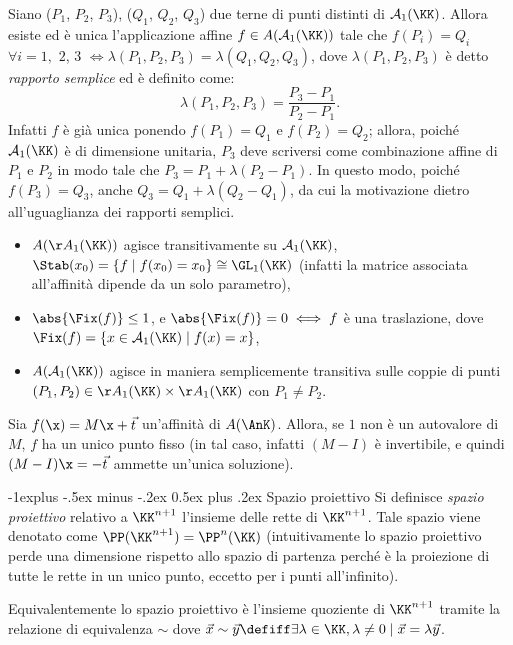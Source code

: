 \documentclass[10pt,landscape]{article}
\makeatletter
\renewcommand{\subsection}{\@startsection{subsection}{2}{0mm}%
	{-1explus -.5ex minus -.2ex}%
	{0.5ex plus .2ex}%
	{\normalfont\normalsize\bfseries}}
\makeatother
\begin{document}
\begin{multicols}{3}
        Siano ($P_1$, $P_2$, $P_3$), ($Q_1$, $Q_2$, $Q_3$) due terne di punti distinti di $\mathcal{A}_1(\KK)$. Allora esiste ed è unica l'applicazione affine $f \in A(\mathcal{A}_1(\KK))$ tale che $f(P_i)=Q_i$ $\forall i=1,$ $2$, $3$ $\iff \lambda(P_1, P_2, P_3)=\lambda(Q_1, Q_2, Q_3)$, dove $\lambda(P_1,P_2,P_3)$ è detto \textit{rapporto semplice} ed è definito come:
        \[ \lambda(P_1, P_2, P_3) = \frac{P_3 - P_1}{P_2 - P_1}. \]
        Infatti $f$ è già unica ponendo $f(P_1) = Q_1$ e $f(P_2) = Q_2$; allora, poiché
        $\mathcal{A}_1(\KK)$ è di dimensione unitaria, $P_3$ deve scriversi come combinazione
        affine di $P_1$ e $P_2$ in modo tale che $P_3 = P_1 + \lambda (P_2 - P_1)$. In questo
        modo, poiché $f(P_3) = Q_3$, anche $Q_3 = Q_1 + \lambda (Q_2 - Q_1)$, da cui la
        motivazione dietro all'uguaglianza dei rapporti semplici.

		\begin{itemize}
			\item $A(\AA_1(\KK))$ agisce transitivamente su $\mathcal{A}_1(\KK)$,
			$\Stab(x_0)=\{f\mid f(x_0)=x_0\} \cong \GL_1(\KK)$ (infatti la matrice associata all'affinità dipende da un solo parametro),
			\item $\abs{\Fix(f)} \leq 1$, e
			$\abs{\Fix(f)}=0 \iff f$ è una traslazione, dove $\Fix(f) = \{x\in \mathcal{A}_1(\KK)\mid f(x)=x\}$,
			\item $A(\mathcal{A}_1(\KK))$ agisce in maniera semplicemente transitiva sulle coppie di punti $(P_1,P_2) \in \AA_1(\KK) \times \AA_1(\KK)$ con $P_1\neq P_2$.
		\end{itemize}
		
		Sia $f(\x) = M\x + \vec t$ un'affinità di $A(\AnK)$. Allora, se $1$ non è un autovalore
		di $M$, $f$ ha un unico punto fisso (in tal caso, infatti $(M-I)$ è invertibile, e quindi $(M-I)\x = -\vec t$ ammette un'unica soluzione).
        
        \subsection{Spazio proiettivo}
        Si definisce \textit{spazio proiettivo} relativo a $\KK^{n+1}$ l'insieme delle rette di $\KK^{n+1}$. Tale spazio viene denotato come $\PP(\KK^{n+1})=\PP^n(\KK)$ (intuitivamente lo spazio proiettivo perde una dimensione rispetto allo spazio di partenza perché è la proiezione di tutte le rette in un unico punto, eccetto per i punti all'infinito).
        
        Equivalentemente lo spazio proiettivo è l'insieme quoziente di $\KK^{n+1}$ tramite
        la relazione di equivalenza $\sim$ dove $\vec x \sim \vec y \defiff \exists \lambda \in \KK, \lambda \neq 0 \mid \vec x = \lambda \vec y$.  


\end{multicols}
\end{document}
